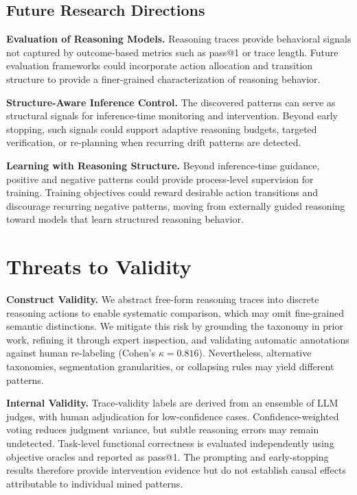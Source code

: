 \documentclass[acmsmall,screen,review,anonymous]{acmart}
\begin{document}
\subsection{Future Research Directions}

\textbf{Evaluation of Reasoning Models.}
Reasoning traces provide behavioral signals not captured by outcome-based metrics such as pass@1 or trace length. Future evaluation frameworks could incorporate action allocation and transition structure to provide a finer-grained characterization of reasoning behavior.

\textbf{Structure-Aware Inference Control.}
The discovered patterns can serve as structural signals for inference-time monitoring and intervention. Beyond early stopping, such signals could support adaptive reasoning budgets, targeted verification, or re-planning when recurring drift patterns are detected.

\textbf{Learning with Reasoning Structure.}
Beyond inference-time guidance, positive and negative patterns could provide process-level supervision for training. Training objectives could reward desirable action transitions and discourage recurring negative patterns, moving from externally guided reasoning toward models that learn structured reasoning behavior.

\section{Threats to Validity}

\textbf{Construct Validity.}
We abstract free-form reasoning traces into discrete reasoning actions to enable systematic comparison, which may omit fine-grained semantic distinctions. We mitigate this risk by grounding the taxonomy in prior work, refining it through expert inspection, and validating automatic annotations against human re-labeling (Cohen's $\kappa=0.816$). Nevertheless, alternative taxonomies, segmentation granularities, or collapsing rules may yield different patterns.

\textbf{Internal Validity.}
Trace-validity labels are derived from an ensemble of LLM judges, with human adjudication for low-confidence cases. Confidence-weighted voting reduces judgment variance, but subtle reasoning errors may remain undetected. Task-level functional correctness is evaluated independently using objective oracles and reported as pass@1. The prompting and early-stopping results therefore provide intervention evidence but do not establish causal effects attributable to individual mined patterns.
\end{document}
